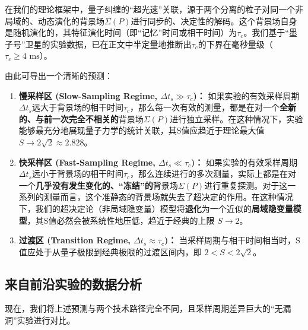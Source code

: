 \documentclass[12pt]{article}
\begin{document}
在我们的理论框架中，量子纠缠的``超光速''关联，源于两个分离的粒子对同一个非局域的、动态演化的背景场$\Sigma(P)$进行同步的、决定性的解码。这个背景场自身是随机演化的，其特征演化时间（即``记忆''时间或相干时间）为$\tau_c$。我们基于``墨子号''卫星的实验数据，已在正文中半定量地推断出$\tau_c$的下界在毫秒量级（$\tau_c \geq 4 \text{ ms}$）。

由此可导出一个清晰的预测：

\begin{enumerate}
    \item \textbf{慢采样区 (Slow-Sampling Regime, $\Delta t_s \gg \tau_c$)：}
    如果实验的有效采样周期$\Delta t_s$远大于背景场的相干时间$\tau_c$，那么每一次有效的测量，都是在对一个\textbf{全新的、与前一次完全不相关的}背景场$\Sigma(P)$进行独立采样。在这种情况下，实验能够最充分地展现量子力学的统计关联，其S值应趋近于理论最大值 \textbf{$S \to 2\sqrt{2} \approx 2.828$}。

    \item \textbf{快采样区 (Fast-Sampling Regime, $\Delta t_s \ll \tau_c$)：}
    如果实验的有效采样周期$\Delta t_s$远小于背景场的相干时间$\tau_c$，那么连续进行的多次测量，实际上都是在对一个\textbf{几乎没有发生变化的、``冻结''的}背景场$\Sigma(P)$进行重复探测。对于这一系列的测量而言，这个准静态的背景场就失去了超决定的作用。在这种情况下，我们的超决定论（非局域隐变量）模型将\textbf{退化}为一个近似的\textbf{局域隐变量模型}，其S值必然会被系统性地压低，趋近于经典的上限 \textbf{$S \to 2$}。

    \item \textbf{过渡区 (Transition Regime, $\Delta t_s \approx \tau_c$)：}
    当采样周期与相干时间相当时，S值应处于从量子极限到经典极限的过渡区间内，即 $2 < S < 2\sqrt{2}$。
\end{enumerate}

\subsection{来自前沿实验的数据分析}

现在，我们将上述预测与两个技术路径完全不同，且采样周期差异巨大的``无漏洞''实验进行对比。
\end{document}
